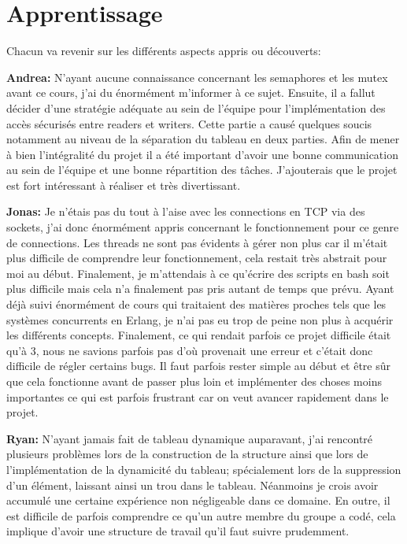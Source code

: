 \documentclass[11pt,a4paper]{article}
\begin{document}
\section{Apprentissage}
Chacun va revenir sur les différents aspects appris ou découverts:


\textbf{Andrea:} N'ayant aucune connaissance concernant les semaphores et les mutex avant ce cours, j'ai du énormément m'informer à ce sujet. Ensuite, il a fallut décider d'une stratégie adéquate au sein de l'équipe pour l'implémentation des accès sécurisés entre readers et writers. Cette partie a causé quelques soucis notamment au niveau de la séparation du tableau en deux parties. Afin de mener à bien l'intégralité du projet il a été important d'avoir une bonne communication au sein de l'équipe et une bonne répartition des tâches. J'ajouterais que le projet est fort intéressant à réaliser et très divertissant.

\textbf{Jonas:} Je n'étais pas du tout à l'aise avec les connections en TCP via des sockets, j'ai donc énormément appris concernant le fonctionnement pour ce genre de connections. Les threads ne sont pas évidents à gérer non plus car il m'était plus difficile de comprendre leur fonctionnement, cela restait très abstrait pour moi au début. Finalement, je m'attendais à ce qu'écrire des scripts en bash soit plus difficile mais cela n'a finalement pas pris autant de temps que prévu. Ayant déjà suivi énormément de cours qui traitaient des matières proches tels que les systèmes concurrents en Erlang, je n'ai pas eu trop de peine non plus à acquérir les différents concepts. Finalement, ce qui rendait parfois ce projet difficile était qu'à 3, nous ne savions parfois pas d'où provenait une erreur et c'était donc difficile de régler certains bugs. Il faut parfois rester simple au début et être sûr que cela fonctionne avant de passer plus loin et implémenter des choses moins importantes ce qui est parfois frustrant car on veut avancer rapidement dans le projet.

\textbf{Ryan:} N'ayant jamais fait de tableau dynamique auparavant, j'ai rencontré plusieurs problèmes lors de la construction de la structure ainsi que lors de l'implémentation de la dynamicité du tableau; spécialement lors de la suppression d'un élément, laissant ainsi un trou dans le tableau. Néanmoins je crois avoir accumulé une certaine expérience non négligeable dans ce domaine. En outre, il est difficile de parfois comprendre ce qu'un autre membre du groupe a codé, cela implique d'avoir une structure de travail qu'il faut suivre prudemment.  
\end{document}
